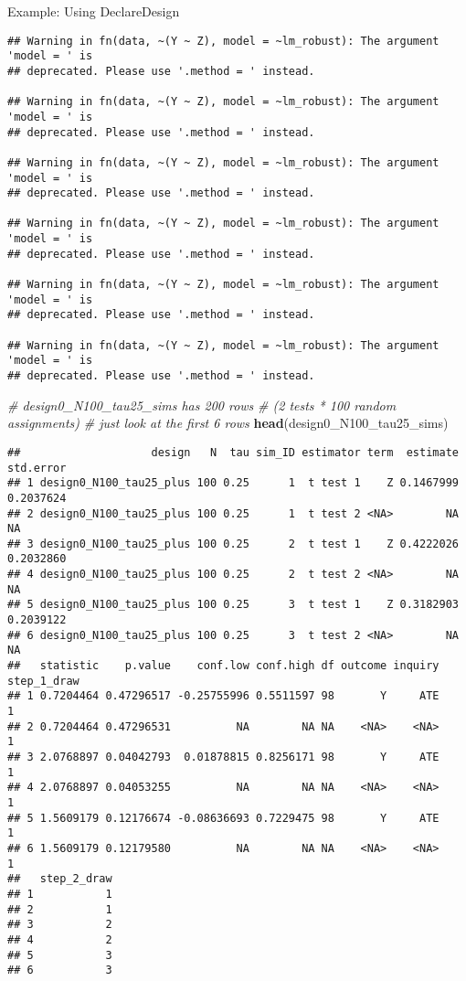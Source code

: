 \documentclass[
  ignorenonframetext,
]{beamer}
\newenvironment{Shaded}{\begin{snugshade}}{\end{snugshade}}
\newcommand{\CommentTok}[1]{\textcolor[rgb]{0.56,0.35,0.01}{\textit{#1}}}
\newcommand{\KeywordTok}[1]{\textcolor[rgb]{0.13,0.29,0.53}{\textbf{#1}}}
\newcommand{\NormalTok}[1]{#1}
\begin{document}
\begin{frame}[fragile]{Example: Using DeclareDesign}
\begin{verbatim}
## Warning in fn(data, ~(Y ~ Z), model = ~lm_robust): The argument 'model = ' is
## deprecated. Please use '.method = ' instead.

## Warning in fn(data, ~(Y ~ Z), model = ~lm_robust): The argument 'model = ' is
## deprecated. Please use '.method = ' instead.

## Warning in fn(data, ~(Y ~ Z), model = ~lm_robust): The argument 'model = ' is
## deprecated. Please use '.method = ' instead.

## Warning in fn(data, ~(Y ~ Z), model = ~lm_robust): The argument 'model = ' is
## deprecated. Please use '.method = ' instead.

## Warning in fn(data, ~(Y ~ Z), model = ~lm_robust): The argument 'model = ' is
## deprecated. Please use '.method = ' instead.

## Warning in fn(data, ~(Y ~ Z), model = ~lm_robust): The argument 'model = ' is
## deprecated. Please use '.method = ' instead.
\end{verbatim}

\begin{Shaded}
\begin{Highlighting}[]
\CommentTok{\# design0\_N100\_tau25\_sims has 200 rows}
\CommentTok{\# (2 tests * 100 random assignments)}
\CommentTok{\# just look at the first 6 rows}
\KeywordTok{head}\NormalTok{(design0\_N100\_tau25\_sims)}
\end{Highlighting}
\end{Shaded}

\begin{verbatim}
##                    design   N  tau sim_ID estimator term  estimate std.error
## 1 design0_N100_tau25_plus 100 0.25      1  t test 1    Z 0.1467999 0.2037624
## 2 design0_N100_tau25_plus 100 0.25      1  t test 2 <NA>        NA        NA
## 3 design0_N100_tau25_plus 100 0.25      2  t test 1    Z 0.4222026 0.2032860
## 4 design0_N100_tau25_plus 100 0.25      2  t test 2 <NA>        NA        NA
## 5 design0_N100_tau25_plus 100 0.25      3  t test 1    Z 0.3182903 0.2039122
## 6 design0_N100_tau25_plus 100 0.25      3  t test 2 <NA>        NA        NA
##   statistic    p.value    conf.low conf.high df outcome inquiry step_1_draw
## 1 0.7204464 0.47296517 -0.25755996 0.5511597 98       Y     ATE           1
## 2 0.7204464 0.47296531          NA        NA NA    <NA>    <NA>           1
## 3 2.0768897 0.04042793  0.01878815 0.8256171 98       Y     ATE           1
## 4 2.0768897 0.04053255          NA        NA NA    <NA>    <NA>           1
## 5 1.5609179 0.12176674 -0.08636693 0.7229475 98       Y     ATE           1
## 6 1.5609179 0.12179580          NA        NA NA    <NA>    <NA>           1
##   step_2_draw
## 1           1
## 2           1
## 3           2
## 4           2
## 5           3
## 6           3
\end{verbatim}


\end{frame}
\end{document}
